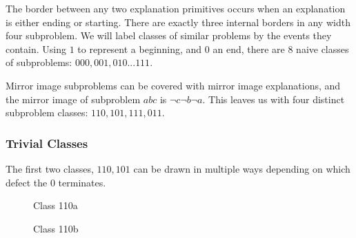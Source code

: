 \documentclass[11pt,twocolumn]{article}
\begin{document}
The border between any two explanation primitives occurs when an explanation is either ending or starting.  There are exactly three internal borders in any width four subproblem.  We will label classes of similar problems by the events they contain.  Using $1$ to represent a beginning, and $0$ an end, there are 8 naive classes of subproblems: $000, 001, 010 ... 111$.

Mirror image subproblems can be covered with mirror image explanations, and the mirror image of subproblem $abc$ is $\neg c \neg b \neg a$.  This leaves us with four distinct subproblem classes: $110, 101, 111, 011$. 

\subsubsection{Trivial Classes}

The first two classes, $110, 101$ can be drawn in multiple ways depending on which defect the $0$ terminates.  

\begin{figure}[H] 
\caption{Class 110a}
\end{figure}

\begin{figure}[H] 
\caption{Class 110b}
\end{figure}
\end{document}
